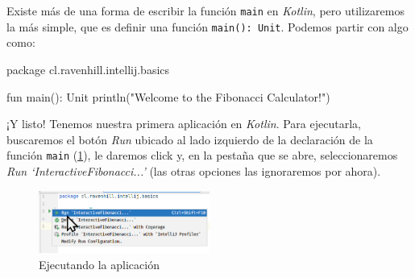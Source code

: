   Existe más de una forma de escribir la función \texttt{main} en \textit{Kotlin}, pero 
  utilizaremos la más simple, que es definir una función \texttt{main(): Unit}.
  Podemos partir con algo como:

  \begin{kotlin}
    package cl.ravenhill.intellij.basics

    fun main(): Unit {
      println("Welcome to the Fibonacci Calculator!")
    }
  \end{kotlin}

  ¡Y listo! 
  Tenemos nuestra primera aplicación en \textit{Kotlin}.
  Para ejecutarla, buscaremos el botón \textit{Run} ubicado al lado izquierdo de la declaración de 
  la función \texttt{main} (\cref{fig:idea64_run_button}), le daremos click y, en la pestaña que
  se abre, seleccionaremos \textit{Run `InteractiveFibonacci...'} (las otras opciones las 
  ignoraremos por ahora).

  \begin{figure}[ht!]
    \centering
    \includegraphics[width=0.5\textwidth]{img/Por_algo_se_empieza/idea64_run_button.png}
    \caption{Ejecutando la aplicación}
    \label{fig:idea64_run_button}
  \end{figure}